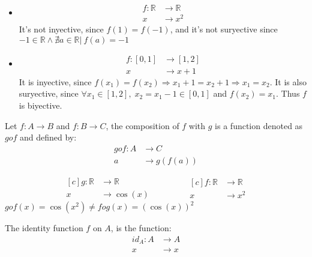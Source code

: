 \documentclass[12pt, a4paper]{book}
\begin{document}
\begin{exmp}
  \begin{itemize}
    \item 
    \begin{align*}
      f:\mathbb{R} &\longrightarrow \mathbb{R} \\
      x &\longrightarrow x^2
    \end{align*}
    It's not inyective, since $f(1) = f(-1)$, and it's not suryective since $-1\in\mathbb{R} \wedge \nexists a \in \mathbb{R}\vert\ f(a)=-1$

    \item 
    \begin{align*}
      f:[0,1] &\longrightarrow [1,2] \\
      x &\longrightarrow x+1
    \end{align*}
    It is inyective, since $f(x_1) = f(x_2) \Rightarrow x_1+1=x_2+1 \Rightarrow x_1 = x_2$. It is also suryective, since $\forall x_1 \in [1,2],\; x_2=x_1-1 \in [0,1]$ and $f(x_2) = x_1$. Thus $f$ is biyective.
  \end{itemize}
\end{exmp}

\begin{defn}
  Let $f:A \longrightarrow B$ and $f:B \longrightarrow C$, the composition of $f$ with $g$ is a function denoted as $g o f$ and defined by:
  \begin{align*}
    g o f:A &\longrightarrow C \\
    a &\longrightarrow g(f(a))
  \end{align*}
\end{defn}

\begin{exmp}
  \begin{equation*}
    \begin{aligned}[c]
      g:\mathbb{R} &\longrightarrow \mathbb{R} \\
      x &\longrightarrow \cos (x)
    \end{aligned}
    \qquad \qquad
    \begin{aligned}[c]
      f:\mathbb{R} &\longrightarrow \mathbb{R} \\
      x &\longrightarrow x^2
    \end{aligned}
  \end{equation*}
  $g o f(x) = \cos (x^2) \neq f o g(x) = {(\cos(x))}^2$
\end{exmp}

\begin{defn}
  The identity function $f$ on $A$, is the function:
  \begin{align*}
    {id}_A:A &\longrightarrow A \\
    x &\longrightarrow x
  \end{align*}
\end{defn}
\end{document}
